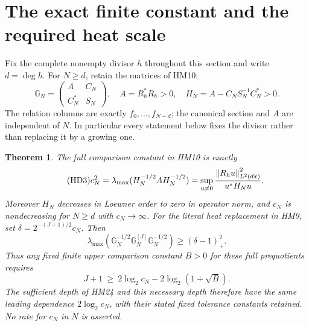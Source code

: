 \documentclass[11pt]{article}
\newtheorem{theorem}{Theorem}[section]
\begin{document}
\section{The exact finite constant and the required heat scale}
Fix the complete nonempty divisor $h$ throughout this section and
write $d=\deg h$. For $N\ge d$, retain the matrices of HM10:
\[
 \mathbb G_N=\begin{pmatrix}A&C_N\\C_N^*&S_N\end{pmatrix},\quad
 A=R_h^*R_h>0,\quad H_N=A-C_NS_N^{-1}C_N^*>0.
\]
The relation columns are exactly $f_0,\ldots,f_{N-d}$; the canonical
section and $A$ are independent of $N$. In particular every statement
below fixes the divisor rather than replacing it by a growing one.

\begin{theorem}
The full comparison constant in HM10 is exactly
\begin{equation}\tag{HD3}
 c_N^2=\lambda_{\max}(H_N^{-1/2}AH_N^{-1/2})
      =\sup_{u\ne0}\frac{\left\lVert R_hu\right\rVert_{L^2(dx)}^2}{u^*H_Nu}.
\end{equation}
Moreover $H_N$ decreases in Loewner order to zero in operator norm,
and $c_N$ is nondecreasing for $N\ge d$ with $c_N\to\infty$.
For the literal heat replacement in HM9, set
$\delta=2^{-(J+1)/2}c_N$. Then
\begin{equation}\tag{HD4}
 \lambda_{\max}\!\left(\mathbb G_N^{-1/2}
                \mathbb G_N^{[J]}\mathbb G_N^{-1/2}\right)
       \ge (\delta-1)_+^2.
\end{equation}
Thus any fixed finite upper comparison constant $B>0$ for these full
prequotients requires
\begin{equation}\tag{HD5}
 J+1\ \ge\ 2\log_2 c_N-2\log_2(1+\sqrt B).
\end{equation}
The sufficient depth of HM24 and this necessary depth therefore have
the same leading dependence $2\log_2 c_N$, with their stated fixed
tolerance constants retained. No rate for $c_N$ in $N$ is asserted.
\end{theorem}
\end{document}
